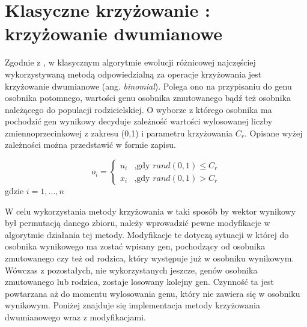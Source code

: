 \section{Klasyczne krzyżowanie : krzyżowanie dwumianowe}\label{sec:strukturaDokumentu}

Zgodnie z \cite{doktorat}, \cite{diff2} w klasycznym algorytmie ewolucji różnicowej najczęściej wykorzystywaną metodą odpowiedzialną za operacje krzyżowania jest krzyżowanie dwumianowe (ang. \textit{binomial}). Polega ono na przypisaniu do genu osobnika potomnego, wartości genu osobnika zmutowanego bądź też osobnika należącego do populacji rodzicielskiej. O wyborze z którego osobnika ma pochodzić gen wynikowy decyduje zależność wartości wylosowanej liczby zmiennoprzecinkowej z zakresu (0,1) i parametru krzyżowania $C_{r}$. Opisane wyżej zależności można przedstawić w formie zapisu.



$$
o_{i} = \left\{ \begin{array}{ll}
u_{i} & \textrm{,gdy $rand(0,1) \le C_{r}$}\\
x_{i} & \textrm{,gdy $rand(0,1) > C_{r}$}
\end{array} \right.
$$
gdzie $i = 1,...,n$
 
W celu wykorzystania metody krzyżowania w taki sposób by wektor wynikowy był permutacją danego zbioru, należy wprowadzić pewne modyfikacje w algorytmie działania tej metody. Modyfikacje te dotyczą sytuacji w której do osobnika wynikowego ma zostać wpisany gen, pochodzący od osobnika zmutowanego czy też od rodzica, który występuje już w osobniku wynikowym. Wówczas z pozostałych, nie wykorzystanych jeszcze, genów osobnika zmutowanego lub rodzica, zostaje losowany kolejny gen. Czynność ta jest powtarzana aż do momentu wylosowania genu, który nie zawiera się w osobniku wynikowym. Poniżej znajduje się implementacja metody krzyżowania dwumianowego wraz z modyfikacjami.

